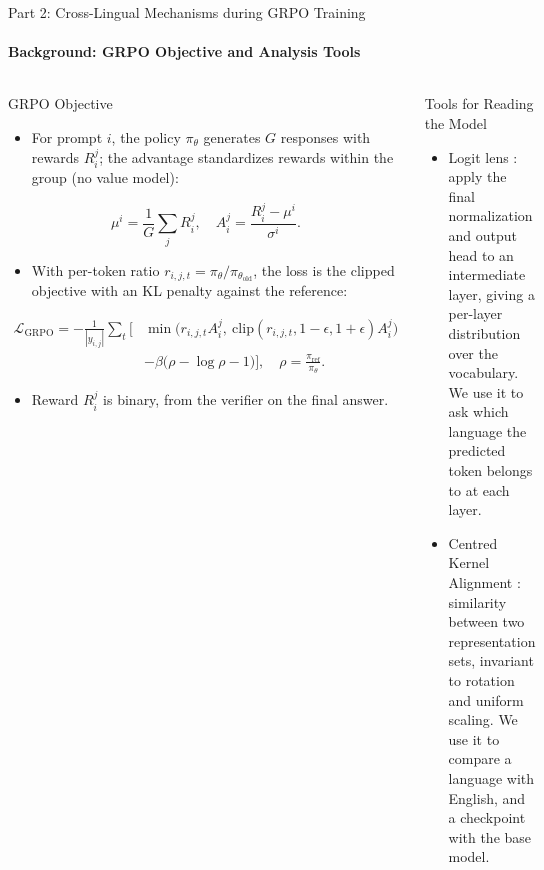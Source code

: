 \documentclass[aspectratio=169]{beamer}
\begin{document}
	\begin{frame}{Part 2: Cross-Lingual Mechanisms during GRPO Training}
		\framesubtitle{Background: GRPO Objective and Analysis Tools}
		\begin{columns}
			\begin{block}{\scriptsize GRPO Objective}\scriptsize
				\begin{itemize}
					\item For prompt $i$, the policy $\pi_\theta$ generates $G$ responses with rewards $R_i^j$; the advantage standardizes rewards within the group (no value model):
				\end{itemize}
				\begin{equation}
					\mu^i = \frac{1}{G}\sum_{j} R_i^j, \quad
					A_i^j = \frac{R_i^j - \mu^i}{\sigma^i}.
				\end{equation}
				\begin{itemize}
					\item With per-token ratio $r_{i,j,t} = \pi_\theta / \pi_{\theta_{\text{old}}}$, the loss is the clipped objective with an KL penalty against the reference:
				\end{itemize}
				\begin{equation}
					\begin{aligned}
						\mathcal{L}_{\text{GRPO}} = -\frac{1}{|y_{i,j}|}\sum_{t}\Big[ &\min\big( r_{i,j,t} A_i^j,\ \mathrm{clip}(r_{i,j,t}, 1{-}\epsilon, 1{+}\epsilon) A_i^j \big) \\
						&- \beta\big( \rho - \log \rho - 1 \big) \Big], \quad \rho = \frac{\pi_{\text{ref}}}{\pi_\theta}.
					\end{aligned}
				\end{equation}
				\begin{itemize}
					\item Reward $R_i^j$ is binary, from the verifier on the final answer.
				\end{itemize}
			\end{block}
			\begin{block}{\scriptsize Tools for Reading the Model}\scriptsize
				\begin{itemize}
					\item Logit lens \autocite{nostalgebraist2020logitlens}: apply the final normalization and output head to an intermediate layer, giving a per-layer distribution over the vocabulary. We use it to ask which language the predicted token belongs to at each layer.
					\item Centred Kernel Alignment \autocite{kornblith2019similarity}: similarity between two representation sets, invariant to rotation and uniform scaling. We use it to compare a language with English, and a checkpoint with the base model.
				\end{itemize}
			\end{block}
		\end{columns}
	\end{frame}
	
\end{document}
